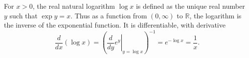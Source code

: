 For $x > 0$, the real natural logarithm $\log x$ is defined as the unique real number $y$ such that $\exp y = x$. Thus as a function from $(0, \infty)$ to $\mathbb{R}$, the logarithm is the inverse of the exponential function. It is differentiable, with derivative
$$
\frac{d}{dx} (\log x) = \left( \left. \frac{d}{dy} e^y \right|_{y = \log x} \right)^{-1} = e^{-\log x} = \frac{1}{x}.
$$

